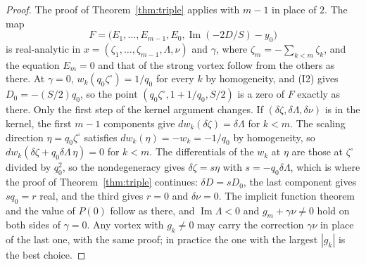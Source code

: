 \documentclass[11pt]{article}
\theoremstyle{definition}
\newcommand{\im}{\operatorname{Im}}
\begin{document}
\begin{proof}
The proof of Theorem~\ref{thm:triple} applies with $m - 1$ in place of $2$. The map
\[
  F = \bigl(E_1, \ldots, E_{m-1}, E_0, \im(-2D/S) - y_0\bigr)
\]
is real-analytic in $x = (\zeta_1, \ldots, \zeta_{m-1}, \Lambda, \nu)$ and $\gamma$, where $\zeta_m = -\sum_{k<m}\zeta_k$, and the equation $E_m = 0$ and that of the strong vortex follow from the others as there. At $\gamma = 0$, $w_k(q_0\zeta^\circ) = 1/q_0$ for every $k$ by homogeneity, and (I2) gives $D_0 = -(S/2)q_0$, so the point $(q_0\zeta^\circ, 1 + 1/q_0, S/2)$ is a zero of $F$ exactly as there. Only the first step of the kernel argument changes. If $(\delta\zeta, \delta\Lambda, \delta\nu)$ is in the kernel, the first $m - 1$ components give $dw_k(\delta\zeta) = \delta\Lambda$ for $k < m$. The scaling direction $\eta = q_0\zeta^\circ$ satisfies $dw_k(\eta) = -w_k = -1/q_0$ by homogeneity, so $dw_k(\delta\zeta + q_0\delta\Lambda\,\eta) = 0$ for $k < m$. The differentials of the $w_k$ at $\eta$ are those at $\zeta^\circ$ divided by $q_0^2$, so the nondegeneracy gives $\delta\zeta = s\eta$ with $s = -q_0\delta\Lambda$, which is where the proof of Theorem~\ref{thm:triple} continues: $\delta D = sD_0$, the last component gives $sq_0 = r$ real, and the third gives $r = 0$ and $\delta\nu = 0$. The implicit function theorem and the value of $P(0)$ follow as there, and $\im\Lambda < 0$ and $g_m + \gamma\nu \ne 0$ hold on both sides of $\gamma = 0$. Any vortex with $g_k \ne 0$ may carry the correction $\gamma\nu$ in place of the last one, with the same proof; in practice the one with the largest $|g_k|$ is the best choice.
\end{proof}
\end{document}
